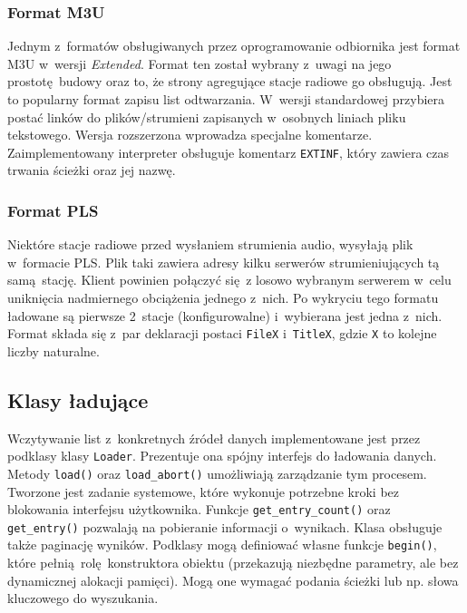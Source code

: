 \documentclass[polish]{aghengthesis}
\begin{document}
			\subsubsection{Format M3U}
				Jednym z~formatów obsługiwanych przez oprogramowanie odbiornika jest format M3U\textsuperscript{\cite{m3u}} w~wersji \textit{Extended}. Format ten został wybrany z~uwagi na jego prostotę budowy oraz to, że strony agregujące stacje radiowe go obsługują. Jest to popularny format zapisu list odtwarzania. W~wersji standardowej przybiera postać linków do plików/strumieni zapisanych w~osobnych liniach pliku tekstowego. Wersja rozszerzona wprowadza specjalne komentarze. Zaimplementowany interpreter obsługuje komentarz \lstinline|EXTINF|, który zawiera czas trwania ścieżki oraz jej nazwę.
			
			\subsubsection{Format PLS}
				Niektóre stacje radiowe przed wysłaniem strumienia audio, wysyłają plik w~formacie PLS\textsuperscript{\cite{pls}}. Plik taki zawiera adresy kilku serwerów strumieniujących tą samą stację.
				Klient powinien połączyć się z losowo wybranym serwerem w~celu uniknięcia nadmiernego obciążenia jednego z~nich.
				Po wykryciu tego formatu ładowane są pierwsze 2~stacje (konfigurowalne) i~wybierana jest jedna z~nich. Format składa się z~par deklaracji postaci \lstinline|FileX| i~\lstinline|TitleX|, gdzie \lstinline|X| to kolejne liczby naturalne.
			
			
		\subsection{Klasy ładujące}
			Wczytywanie list z~konkretnych źródeł danych implementowane jest przez podklasy klasy \lstinline|Loader|. Prezentuje ona spójny interfejs do ładowania danych. Metody \lstinline|load()| oraz \lstinline|load_abort()| umożliwiają zarządzanie tym procesem. Tworzone jest zadanie systemowe, które wykonuje potrzebne kroki bez blokowania interfejsu użytkownika. Funkcje \lstinline|get_entry_count()| oraz \lstinline|get_entry()| pozwalają na pobieranie informacji o~wynikach. Klasa obsługuje także paginację wyników. Podklasy mogą definiować własne funkcje \lstinline|begin()|, które pełnią rolę konstruktora obiektu (przekazują niezbędne parametry, ale bez dynamicznej alokacji pamięci). Mogą one wymagać podania ścieżki lub np. słowa kluczowego do wyszukania.
			
\end{document}
